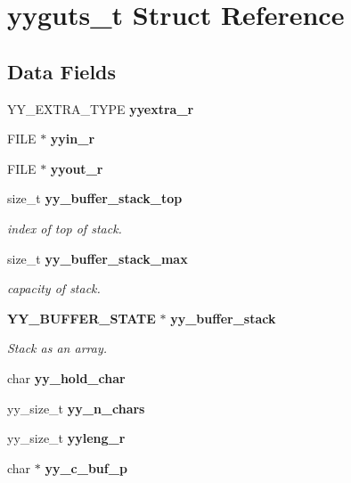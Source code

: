 \section{yyguts\+\_\+t Struct Reference}
\label{structyyguts__t}
\subsection*{Data Fields}
\begin{DoxyCompactItemize}
\item 
\mbox{\label{structyyguts__t_aef05c0d6725a5214f6b30466f0b01c47}} 
Y\+Y\+\_\+\+E\+X\+T\+R\+A\+\_\+\+T\+Y\+PE {\bfseries yyextra\+\_\+r}
\item 
\mbox{\label{structyyguts__t_a21f81ca100b12364a5095a37d1c6f650}} 
F\+I\+LE $\ast$ {\bfseries yyin\+\_\+r}
\item 
\mbox{\label{structyyguts__t_a436368a905aaf12e809e265749c74031}} 
F\+I\+LE $\ast$ {\bfseries yyout\+\_\+r}
\item 
size\+\_\+t \textbf{ yy\+\_\+buffer\+\_\+stack\+\_\+top}
\begin{DoxyCompactList}\small\item\em index of top of stack. \end{DoxyCompactList}\item 
size\+\_\+t \textbf{ yy\+\_\+buffer\+\_\+stack\+\_\+max}
\begin{DoxyCompactList}\small\item\em capacity of stack. \end{DoxyCompactList}\item 
\textbf{ Y\+Y\+\_\+\+B\+U\+F\+F\+E\+R\+\_\+\+S\+T\+A\+TE} $\ast$ \textbf{ yy\+\_\+buffer\+\_\+stack}
\begin{DoxyCompactList}\small\item\em Stack as an array. \end{DoxyCompactList}\item 
\mbox{\label{structyyguts__t_adde3f71374c223bbac47284824996e86}} 
char {\bfseries yy\+\_\+hold\+\_\+char}
\item 
\mbox{\label{structyyguts__t_ac9eb8a4cedd3008b47b7644692b93a3f}} 
yy\+\_\+size\+\_\+t {\bfseries yy\+\_\+n\+\_\+chars}
\item 
\mbox{\label{structyyguts__t_ab55d594683be54bcd45a64c4bf26427e}} 
yy\+\_\+size\+\_\+t {\bfseries yyleng\+\_\+r}
\item 
\mbox{\label{structyyguts__t_ab1b9bcacb33aab1e02b625512bc0e221}} 
char $\ast$ {\bfseries yy\+\_\+c\+\_\+buf\+\_\+p}
\item 

\end{DoxyCompactItemize}
